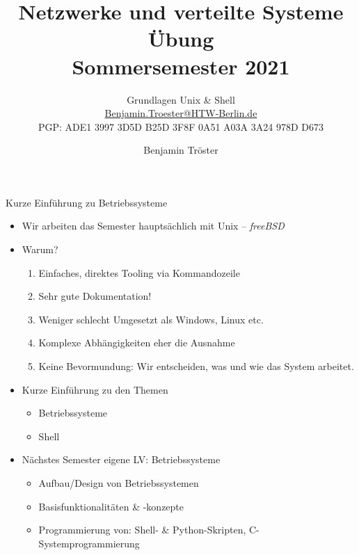 \documentclass[xcolor=dvipsnames,aspectratio=169]{beamer}
\begin{document}

\title{Netzwerke und verteilte Systeme\\Übung\\Sommersemester 2021}
\subtitle{Grundlagen Unix \& Shell\\
\href{mailto:Benjamin.Troester@HTW-Berlin.de}{Benjamin.Troester@HTW-Berlin.de}\\
		PGP: ADE1 3997 3D5D B25D 3F8F 0A51 A03A 3A24 978D D673 }

\author{Benjamin Tröster}

\date{}

\begin{frame}
\titlepage
\end{frame}

\begin{frame}{Kurze Einführung zu Betriebssysteme}
 \vspace*{-0.8cm} 
	\begin{itemize}
		\item Wir arbeiten das Semester hauptsächlich mit Unix -- \emph{freeBSD}
		\item Warum?
		\begin{enumerate}
			\item Einfaches, direktes Tooling via Kommandozeile
			\item Sehr gute Dokumentation!
			\item Weniger schlecht Umgesetzt als Windows, Linux etc.
			\item Komplexe Abhängigkeiten eher die Ausnahme
			\item Keine Bevormundung: Wir entscheiden, was und wie das System arbeitet.
		\end{enumerate}
		\item Kurze Einführung zu den Themen
		\begin{itemize}
			\item Betriebssysteme
			\item Shell
		\end{itemize}
		\item Nächstes Semester eigene LV: Betriebssysteme
		\begin{itemize}
			\item Aufbau/Design von Betriebssystemen
			\item Basisfunktionalitäten \& -konzepte
			\item Programmierung von: Shell- \& Python-Skripten, C-Systemprogrammierung
		\end{itemize}
	\end{itemize}
\end{frame}
\end{document}
